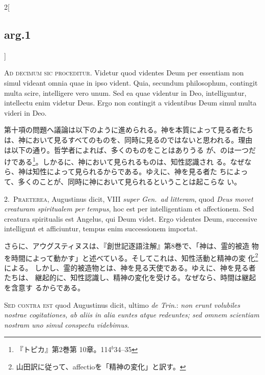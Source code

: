 \documentclass[paper=a4paper,fontsize=10pt,jafontsize=9pt,titlepage]{jlreq}
\begin{document}
\begin{paracol}{2}[\subsection{arg.1}]

{\scshape  Ad decimum sic proceditur}. Videtur quod videntes Deum per
 essentiam non simul videant omnia quae in ipso vident. Quia, secundum
 philosophum, contingit multa scire, intelligere vero unum. Sed ea quae
 videntur in Deo, intelliguntur, intellectu enim videtur Deus. Ergo non
 contingit a videntibus Deum simul multa videri in Deo.

\switchcolumn

第十項の問題へ議論は以下のように進められる。神を本質によって見る者たち
は、神において見るすべてのものを、同時に見るのではないと思われる。理由
は以下の通り。哲学者によれば、多くのものをことはありうる
が、のは一つだけである\footnote{『トピカ』第2巻第
10章。114$^{b}$34--35}。しかるに、神において見られるものは、知性認識され
る。なぜなら、神は知性によって見られるからである。ゆえに、神を見る者た
ちによって、多くのことが、同時に神において見られるということは起こらな
い。


2.~{\scshape Praeterea}, Augustinus dicit, VIII {\itshape super Gen.~ad
 litteram}, quod {\itshape Deus movet creaturam spiritualem per tempus},
 hoc est per intelligentiam et affectionem. Sed creatura spiritualis
 est Angelus, qui Deum videt. Ergo videntes Deum, successive
 intelligunt et afficiuntur, tempus enim successionem importat.

\switchcolumn

さらに、アウグスティヌスは、『創世記逐語注解』第8巻で、「神は、霊的被造
物を時間によって動かす」と述べている。そしてこれは、知性活動と精神の変
化\footnote{山田訳に従って、affectioを「精神の変化」と訳す。}による。
しかし、霊的被造物とは、神を見る天使である。ゆえに、神を見る者たちは、
継起的に、知性認識し、精神の変化を受ける。なぜなら、時間は継起を含意す
るからである。

\switchcolumn*[\subsection{s.c.}]

{\scshape Sed contra est} quod Augustinus dicit, ultimo {\itshape de Trin}.:
 {\itshape non erunt volubiles nostrae cogitationes, ab aliis in alia
 euntes atque redeuntes; sed omnem scientiam nostram uno simul
 conspectu videbimus}.


\end{paracol}
\end{document}
